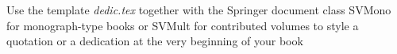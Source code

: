 
%
%
%

\begin{dedication}
Use the template \emph{dedic.tex} together with the Springer document class SVMono for monograph-type books or SVMult for contributed volumes to style a quotation or a dedication at the very beginning of your book
\end{dedication}





